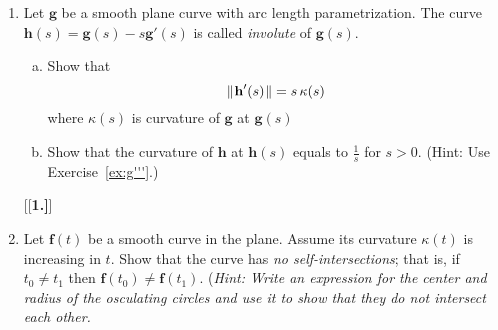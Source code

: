 \begin{enumerate}[\bfseries 1.]
  \item Let $\textbf{g}$ be a smooth plane curve with arc length parametrization.
  The curve $\textbf{h}(s)=\textbf{g}(s)-s\textbf{g}'(s)$ is called \emph{involute} of $\textbf{g}(s)$.
  \begin{enumerate}[(a)]
  \item Show that 
  \[\lVert\mspace{1mu}\textbf{h}'(s)\mspace{1mu}\rVert=s\,\kappa(s)\] 
  where $\kappa(s)$ is curvature of $\textbf{g}$ at $\textbf{g}(s)$
  \item Show that the curvature of $\textbf{h}$ at $\textbf{h}(s)$ equals to $\tfrac1s$ for $s>0$. (Hint: Use Exercise~\ref{ex:g'''}.)
  \end{enumerate}
[{[\bfseries 1.]}]
   \item Let $\textbf{f}(t)$ be a smooth curve in the plane.
   Assume its curvature $\kappa(t)$ is increasing in $t$.
   Show that the curve has \emph{no self-intersections};
   that is, if $t_0\ne t_1$ then $\textbf{f}(t_0)\ne\textbf{f}(t_1)$.
   (\textit{Hint: Write an expression for the center and radius of the osculating circles and use it to show that they do not intersect each other.}
\end{enumerate}

